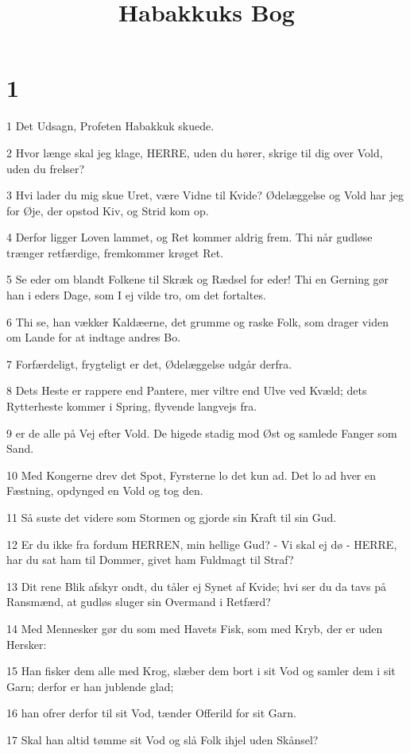 

\title{Habakkuks Bog}


\chapter{1}

\par 1 Det Udsagn, Profeten Habakkuk skuede.
\par 2 Hvor længe skal jeg klage, HERRE, uden du hører, skrige til dig over Vold, uden du frelser?
\par 3 Hvi lader du mig skue Uret, være Vidne til Kvide? Ødelæggelse og Vold har jeg for Øje, der opstod Kiv, og Strid kom op.
\par 4 Derfor ligger Loven lammet, og Ret kommer aldrig frem. Thi når gudløse trænger retfærdige, fremkommer krøget Ret.
\par 5 Se eder om blandt Folkene til Skræk og Rædsel for eder! Thi en Gerning gør han i eders Dage, som I ej vilde tro, om det fortaltes.
\par 6 Thi se, han vækker Kaldæerne, det grumme og raske Folk, som drager viden om Lande for at indtage andres Bo.
\par 7 Forfærdeligt, frygteligt er det, Ødelæggelse udgår derfra.
\par 8 Dets Heste er rappere end Pantere, mer viltre end Ulve ved Kvæld; dets Rytterheste kommer i Spring, flyvende langvejs fra.
\par 9 er de alle på Vej efter Vold. De higede stadig mod Øst og samlede Fanger som Sand.
\par 10 Med Kongerne drev det Spot, Fyrsterne lo det kun ad. Det lo ad hver en Fæstning, opdynged en Vold og tog den.
\par 11 Så suste det videre som Stormen og gjorde sin Kraft til sin Gud.
\par 12 Er du ikke fra fordum HERREN, min hellige Gud? - Vi skal ej dø - HERRE, har du sat ham til Dommer, givet ham Fuldmagt til Straf?
\par 13 Dit rene Blik afskyr ondt, du tåler ej Synet af Kvide; hvi ser du da tavs på Ransmænd, at gudløs sluger sin Overmand i Retfærd?
\par 14 Med Mennesker gør du som med Havets Fisk, som med Kryb, der er uden Hersker:
\par 15 Han fisker dem alle med Krog, slæber dem bort i sit Vod og samler dem i sit Garn; derfor er han jublende glad;
\par 16 han ofrer derfor til sit Vod, tænder Offerild for sit Garn.
\par 17 Skal han altid tømme sit Vod og slå Folk ihjel uden Skånsel?


